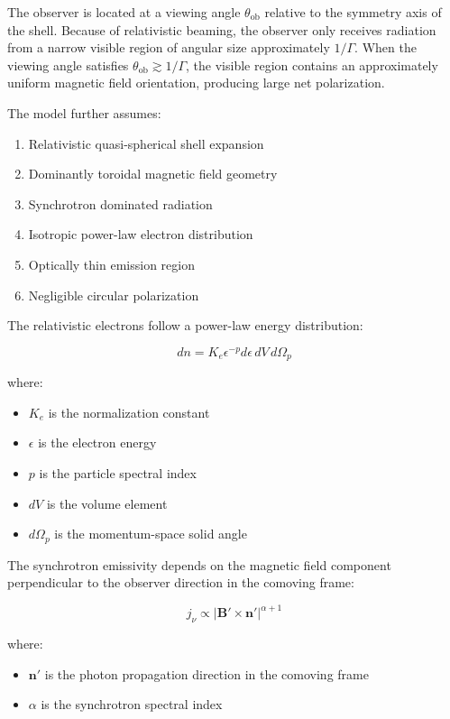 \documentclass{article}
\begin{document}
The observer is located at a viewing angle \(\theta_{\mathrm{ob}}\) relative to the symmetry axis of the shell. Because of relativistic beaming, the observer only receives radiation from a narrow visible region of angular size approximately \(1/\Gamma\). When the viewing angle satisfies \(\theta_{\mathrm{ob}} \gtrsim 1/\Gamma\), the visible region contains an approximately uniform magnetic field orientation, producing large net polarization.

The model further assumes:
\begin{enumerate}
    \item Relativistic quasi-spherical shell expansion
    \item Dominantly toroidal magnetic field geometry
    \item Synchrotron dominated radiation
    \item Isotropic power-law electron distribution
    \item Optically thin emission region
    \item Negligible circular polarization
\end{enumerate}

The relativistic electrons follow a power-law energy distribution:

\begin{equation}
dn = K_e \epsilon^{-p} d\epsilon \, dV \, d\Omega_p
\end{equation}

where:
\begin{itemize}
    \item \(K_e\) is the normalization constant
    \item \(\epsilon\) is the electron energy
    \item \(p\) is the particle spectral index
    \item \(dV\) is the volume element
    \item \(d\Omega_p\) is the momentum-space solid angle
\end{itemize}

The synchrotron emissivity depends on the magnetic field component perpendicular to the observer direction in the comoving frame:

\begin{equation}
j_{\nu} \propto \left| \mathbf{B}' \times \mathbf{n}' \right|^{\alpha + 1}
\end{equation}

where:
\begin{itemize}
    \item \(\mathbf{n}'\) is the photon propagation direction in the comoving frame
    \item \(\alpha\) is the synchrotron spectral index
\end{itemize}
\end{document}
